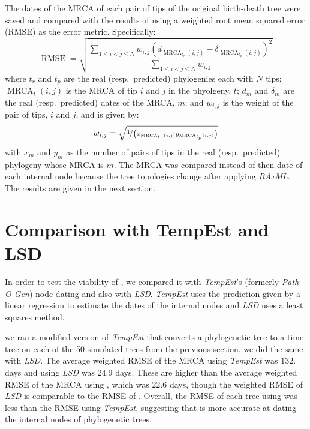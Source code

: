 \documentclass{bioinfo}
\begin{document}
The dates of the MRCA of each pair of tips of the original birth-death tree were saved and compared with the results of  using a weighted root mean squared error (RMSE) as the error metric.
Specifically:
\[\operatorname{RMSE} = \sqrt{\frac{\sum_{1 \leq i < j \leq N}w_{i,j}\left(d_{\operatorname{MRCA}_{t_r}(i,j)} - \delta_{\operatorname{MRCA}_{t_p}(i,j)}\right)^2}{\sum_{1 \leq i < j \leq N}w_{i,j}}}\]
where $t_r$ and $t_p$ are the real (resp.~predicted) phylogenies each with $N$ tips; $\operatorname{MRCA}_t(i, j)$ is the MRCA of tip $i$ and $j$ in the phyolgeny, $t$; $d_{m}$ and $\delta_m$ are the real (resp.~predicted) dates of the MRCA, $m$; and $w_{i, j}$ is the weight of the pair of tips, $i$ and $j$, and is given by:
\[w_{i, j} = \sqrt{\nicefrac{1}{\left(x_{\operatorname{MRCA}_{t_r}(i,j)}y_{\operatorname{MRCA}_{t_p}(i,j)}\right)}}\]
with $x_m$ and $y_m$ as the number of pairs of tips in the real (resp.~predicted) phylogeny whose MRCA is $m$.
The MRCA was compared instead of then date of each internal node because the tree topologies change after applying \emph{RAxML}. The results are given in the next section.

\section{Comparison with TempEst and LSD} \label{sec:tempest}
In order to test the viability of , we compared it with \emph{TempEst}'s (formerly \emph{Path-O-Gen}) node dating and also with \emph{LSD}.
\emph{TempEst} uses the prediction given by a linear regression to estimate the dates of the internal nodes and \emph{LSD} uses a least squares method.

we ran a modified version of \emph{TempEst} that converts a phylogenetic tree to a time tree on each of the 50 simulated trees from the previous section.
we did the same with \emph{LSD}.
The average weighted RMSE of the MRCA using \emph{TempEst} was $132.$ days and using \emph{LSD} was $24.9$ days.
These are higher than the average weighted RMSE of the MRCA using , which was $22.6$ days, though the weighted RMSE of \emph{LSD} is comparable to the RMSE of .
Overall, the RMSE of each tree using  was less than the RMSE using \emph{TempEst}, suggesting that  is more accurate at dating the internal nodes of phylogenetic trees.
\end{document}

